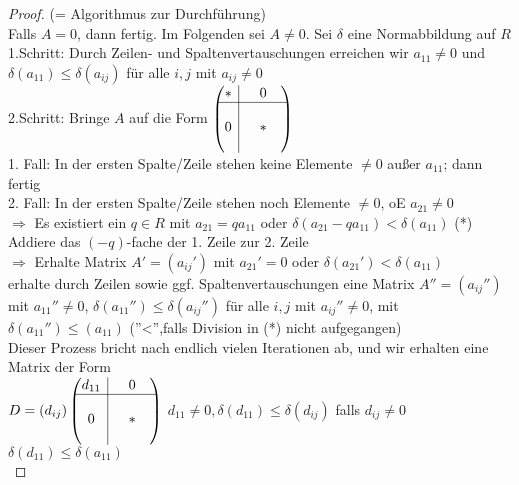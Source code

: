 \documentclass[10pt,a4paper,numbers=endperiod]{scrartcl}
\theoremstyle{definition}
\begin{document}
\begin{proof}
	(= Algorithmus zur Durchführung)\\
	Falls $A = 0$, dann fertig. Im Folgenden sei $A \neq 0$. Sei $\delta$ eine Normabbildung auf $R$\\
	
	1.Schritt: Durch Zeilen- und Spaltenvertauschungen erreichen wir $a_{11} \neq 0$ und $\delta(a_{11}) \leq \delta(a_{ij})$ für alle $i, j$ mit $a_{ij} \neq 0$\\
	
	2.Schritt: Bringe $A$ auf die Form $\begin{pmatrix}
	\multicolumn{1}{c|}{*} &  & 0 &\\
	\hline 
	\multicolumn{1}{c|}{}& & &\\
	\multicolumn{1}{c|}{0} & & * &\\
	\multicolumn{1}{c|}{}& & &\\
	\end{pmatrix}$\\
	1. Fall: In der ersten Spalte/Zeile stehen keine Elemente $\neq 0$ außer $a_11$; dann fertig\\
	2. Fall: In der ersten Spalte/Zeile stehen noch Elemente $\neq 0$, oE $a_{21} \neq 0$\\
	$\Rightarrow$ Es existiert ein $q \in R$ mit $a_{21} = q a_{11}$ oder $\delta(a_{21} - qa_{11}) < \delta(a_{11})$ (*)\\
	Addiere das $(-q)$-fache der 1. Zeile zur 2. Zeile\\
	$\Rightarrow$ Erhalte Matrix $A' = (a_{ij}')$ mit $a_{21}' = 0$ oder $\delta(a_{21}') < \delta(a_{11})$\\
	erhalte durch Zeilen sowie ggf. Spaltenvertauschungen eine Matrix $A'' = (a_{ij}'')$ mit $a_{11}'' \neq 0$, $\delta(a_{11}'') \leq \delta(a_{ij}'')$ für alle $i,j$ mit $a_{ij}'' \neq 0$, mit $\delta(a_{11}'') \leq(a_{11})$ (''<'',falls Division in (*) nicht aufgegangen)\\
	Dieser Prozess bricht nach endlich vielen Iterationen ab, und wir erhalten eine Matrix der Form\\
	
	$D = (d_{ij})\begin{pmatrix}
	\multicolumn{1}{c|}{d_{11}}& & 0 &\\
	\hline
	\multicolumn{1}{c|}{}& & &\\
	\multicolumn{1}{c|}{0}& & * &\\
	\multicolumn{1}{c|}{}& & &\\
	\end{pmatrix}$ $d_{11} \neq 0, \delta(d_{11}) \leq \delta(d_{ij})$ falls $d_{ij} \neq 0$ $\delta(d_{11}) \leq \delta(a_{11})$\\
	

\end{proof}
\end{document}
